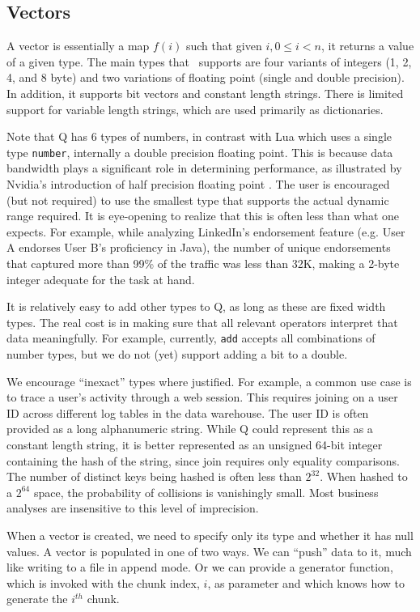 \subsection{Vectors}
\label{Vectors}
A vector is essentially a map \(f(i)\) such that given \(i, 0 \leq i < n\), it
returns a value of a given type. The main types that \Q\ supports are four variants
of integers (1, 2, 4, and 8 byte) and two variations of floating point (single
and double precision). In addition, it supports bit vectors and constant length
strings. There is limited support for variable length strings, which are used
primarily as dictionaries. 

Note that Q has 6 types of numbers, in contrast with Lua which uses a 
single type {\tt number}, internally a double precision floating point.
This is because data bandwidth plays a significant role in determining
performance, as illustrated by Nvidia's
introduction of half precision floating point  \cite{nvidia2017}. The user is
encouraged (but not required) to use the smallest type that supports the actual
dynamic range required. It is eye-opening to realize that this is often  less
than what one expects. For example, while analyzing LinkedIn's endorsement feature
(e.g. User A endorses User B's proficiency in Java),
the number of unique endorsements that captured more than 99\% of the traffic
was less than 32K, making a 2-byte integer adequate for the task at hand.

It is relatively easy to add other types to Q, as long as these 
are fixed width types. The real cost is in making sure that all relevant
operators interpret that data meaningfully. For example, currently, {\tt add}
accepts all combinations of number types, but we do not (yet)
support adding a bit to a double.

We
encourage ``inexact'' types where justified. For example, a common use case is
to trace a user's activity through a web session. This requires joining on a
user ID across different log tables in the data warehouse. The user ID is
often provided as a long alphanumeric string. While Q could represent this as a
constant length string, it is better represented as an unsigned 64-bit integer
containing the hash of the string, since join requires only equality comparisons.
The number of distinct keys being hashed is often less than \(2^{32}\). When
hashed to a \(2^{64}\) space, the probability of collisions is vanishingly
small. Most business analyses are insensitive to this level of imprecision.

When a vector is created, we need to specify only its type and whether it has
null values. A vector is populated in one of two ways. We can ``push'' data to
it, much like writing to a file in append mode. Or we can provide a generator function,
which is invoked with the chunk index, \(i\), as parameter and which knows how to
generate the \(i^{th}\) chunk.

